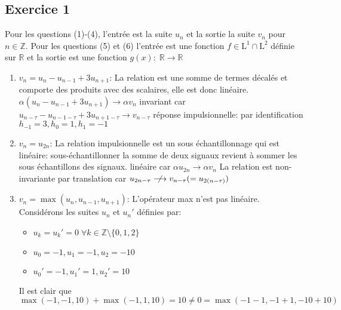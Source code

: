 \documentclass[12pt]{article}
\begin{document}
\subsection*{Exercice 1}
Pour les questions (1)-(4), l'entrée est la suite $u_n$ et la sortie la suite $v_n$ pour $n \in \mathbb{Z}$. \newline
Pour les questions (5) et (6) l'entrée est une fonction $f \in \mathrm{L}^1 \cap \mathrm{L}^2$ définie sur $\mathbb{R}$ et la sortie est une fonction $g(x): \; \mathbb{R} \rightarrow \mathbb{R}$
\begin{enumerate}
\item $v_n = u_n - u_{n-1} + 3u_{n+1}$: \newline
La relation est une somme de termes décalés et comporte des produits avec des scalaires, elle est donc linéaire. $\alpha(u_n - u_{n-1} + 3u_{n+1}) \rightarrow \alpha v_n$ \newline
invariant car $u_{n-\tau} - u_{n-1-\tau} + 3u_{n+1-\tau} \rightarrow v_{n-\tau}$ \newline
réponse impulsionnelle: par identification $h_{-1} = 3, h_0 = 1, h_1 = -1$
\item $v_n = u_{2n}$: \newline
La relation impulsionnelle est un sous échantillonnage qui est linéaire: sous-échantillonner la somme de deux signaux revient à sommer les sous échantillons des signaux.
linéaire car $\alpha u_{2n} \rightarrow \alpha v_n$ \newline
La relation est non-invariante par translation car $u_{2n-\tau} \centernot\longrightarrow v_{n-\tau} (=u_{2(n-\tau)})$
\item $v_n = \max(u_n, u_{n-1}, u_{n+1})$: \newline
L'opérateur max n'est pas linéaire. Considérons les suites $u_n$ et $u_n'$ définies par: \newline
\begin{itemize}
\item $u_k = u_k' = 0 \;\forall k \in \mathbb{Z} \setminus \{0, 1, 2\}$
\item $u_0 = -1, u_1 = -1, u_2 = -10 $
\item $u_0' = -1, u_1' = 1, u_2' = 10 $
\end{itemize}
Il est clair que $$ \max(-1, -1, 10) + \max(-1, 1, 10) = 10 \neq 0 = \max(-1-1, -1+1, -10 + 10)$$


\end{enumerate}
\end{document}
